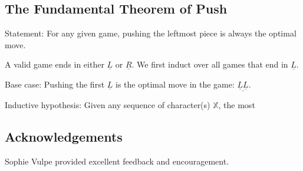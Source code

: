 \documentclass[11pt]{article}
\begin{document}
\subsection*{The Fundamental Theorem of Push}
\label{sec:orge864b6a}
Statement: For any given game, pushing the leftmost piece is always the optimal move.

\bigskip

A valid game ends in either \(\underline{L}\) or \(\underline{R}\).
We first induct over all games that end in \(\underline{L}\).

\bigskip

Base case:
Pushing the first \(\underline{L}\) is the optimal move in the game: \(\underline{\underline{L}\underline{L}}\).

Inductive hypothesis:
Given any sequence of character(s) \(\mathbb{X}\), the most

\bigskip



\subsection*{Acknowledgements}
\label{sec:orgc80ed16}
Sophie Vulpe provided excellent feedback and encouragement.
\end{document}
